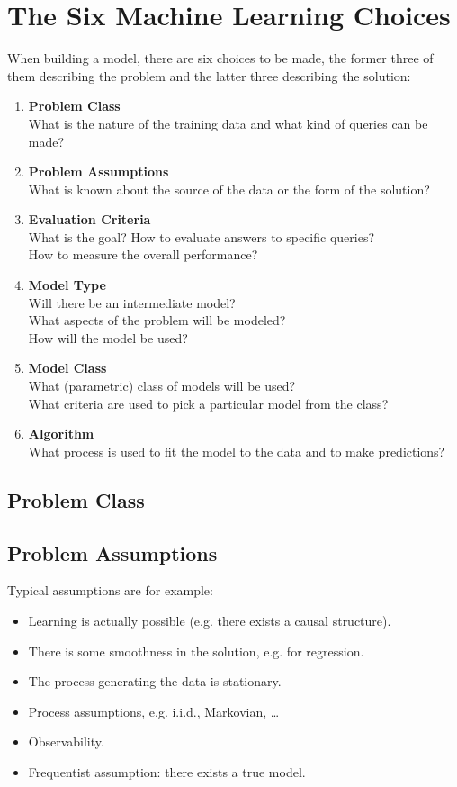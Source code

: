 	\section{The Six Machine Learning Choices}
		When building a model, there are six choices to be made, the former three of them describing the problem and the latter three describing the solution:
		\begin{enumerate}
			\item \textbf{Problem Class} \\
				What is the nature of the training data and what kind of queries can be made?
			\item \textbf{Problem Assumptions} \\
				What is known about the source of the data or the form of the solution?
			\item \textbf{Evaluation Criteria} \\
				What is the goal? How to evaluate answers to specific queries? \\
				How to measure the overall performance?
			\item \textbf{Model Type} \\
				Will there be an intermediate model? \\
				What aspects of the problem will be modeled? \\
				How will the model be used?
			\item \textbf{Model Class} \\
				What (parametric) class of models will be used? \\
				What criteria are used to pick a particular model from the class?
			\item \textbf{Algorithm} \\
				What process is used to fit the model to the data and to make predictions?
		\end{enumerate}

		\subsection{Problem Class} %

		\subsection{Problem Assumptions}
			Typical assumptions are for example:
			\begin{itemize}
				\item Learning is actually possible (e.g. there exists a causal structure).
				\item There is some smoothness in the solution, e.g. for regression.
				\item The process generating the data is stationary.
				\item Process assumptions, e.g. i.i.d., Markovian, \dots
				\item Observability.
				\item Frequentist assumption: there exists a true model.
			\end{itemize}

